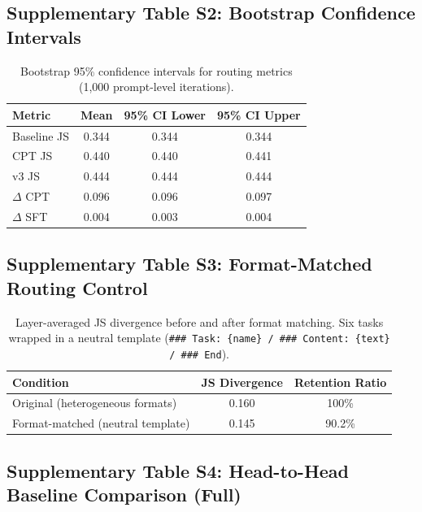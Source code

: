 \documentclass[11pt]{article}
\begin{document}
\subsection{Supplementary Table S2: Bootstrap Confidence Intervals}

\begin{table}[H]
\centering
\caption{Bootstrap 95\% confidence intervals for routing metrics (1,000 prompt-level iterations).}
\begin{tabular}{lccc}
\toprule
\textbf{Metric} & \textbf{Mean} & \textbf{95\% CI Lower} & \textbf{95\% CI Upper} \\
\midrule
Baseline JS & 0.344 & 0.344 & 0.344 \\
CPT JS & 0.440 & 0.440 & 0.441 \\
v3 JS & 0.444 & 0.444 & 0.444 \\
$\Delta$ CPT & 0.096 & 0.096 & 0.097 \\
$\Delta$ SFT & 0.004 & 0.003 & 0.004 \\
\bottomrule
\end{tabular}
\end{table}

\subsection{Supplementary Table S3: Format-Matched Routing Control}

\begin{table}[H]
\centering
\caption{Layer-averaged JS divergence before and after format matching. Six tasks wrapped in a neutral template (\texttt{\#\#\# Task: \{name\} / \#\#\# Content: \{text\} / \#\#\# End}).}
\begin{tabular}{lcc}
\toprule
\textbf{Condition} & \textbf{JS Divergence} & \textbf{Retention Ratio} \\
\midrule
Original (heterogeneous formats) & 0.160 & 100\% \\
Format-matched (neutral template) & 0.145 & 90.2\% \\
\bottomrule
\end{tabular}
\end{table}

\subsection{Supplementary Table S4: Head-to-Head Baseline Comparison (Full)}
\end{document}
